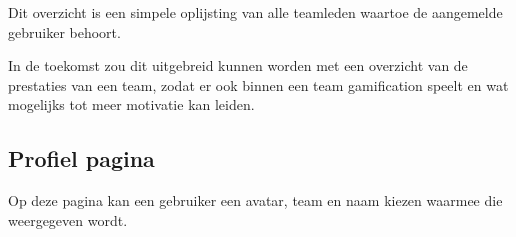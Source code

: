 Dit overzicht is een simpele oplijsting van alle teamleden waartoe de aangemelde gebruiker behoort.

In de toekomst zou dit uitgebreid kunnen worden met een overzicht van de prestaties van een team, zodat er ook binnen een team gamification speelt en wat mogelijks tot meer motivatie kan leiden.

\subsection{Profiel pagina}

Op deze pagina kan een gebruiker een avatar, team en naam kiezen waarmee die weergegeven wordt.
